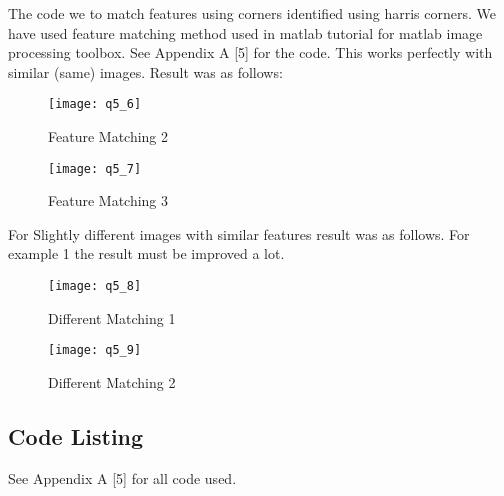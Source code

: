 	The code we to match features using corners identified using harris corners. We have used feature matching method used in matlab tutorial for matlab image processing toolbox. See Appendix A [5] for the code. This works perfectly with similar (same) images. Result was as follows:
	\newline	
	\begin{figure}[position = here]
		\begin{centering}
			\texttt{[image: q5\_6]}\\
			\caption[\textit{RPYAxes}]{Feature Matching 2}
		\end{centering}
	\end{figure}
	\newline
	\newline	
	\begin{figure}[position = here]
		\begin{centering}
			\texttt{[image: q5\_7]}\\
			\caption[\textit{RPYAxes}]{Feature Matching 3}
		\end{centering}
	\end{figure}
	\pagebreak
	\newline
	For Slightly different images with similar features result was as follows. For example 1 the result must be improved a lot.
	\newline	
	\begin{figure}[position = here]
		\begin{centering}
			\texttt{[image: q5\_8]}\\
			\caption[\textit{RPYAxes}]{Different Matching 1}
		\end{centering}
	\end{figure}
	\newline
	\newline	
	\begin{figure}[position = here]
		\begin{centering}
			\texttt{[image: q5\_9]}\\
			\caption[\textit{RPYAxes}]{Different Matching 2}
		\end{centering}
	\end{figure}
	\newline
		
	\pagebreak
	\subsection*{Code Listing}
	See Appendix A [5] for all code used.
\pagebreak